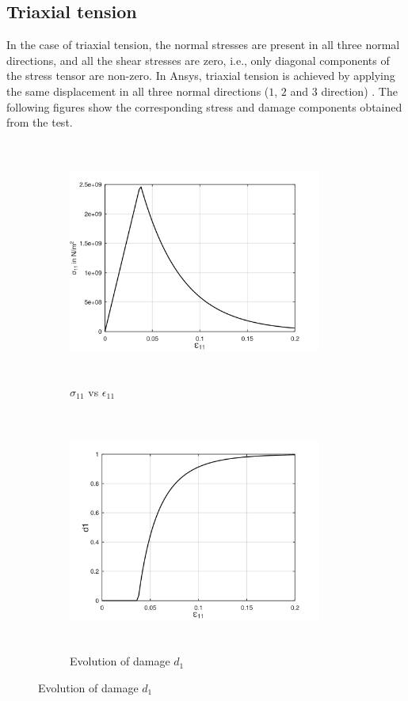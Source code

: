 \documentclass[12pt,openright,twoside]{report}
\begin{document}
\subsection{Triaxial tension}
\indent\indent\indent In the case of triaxial tension, the normal stresses are present in all three normal directions, and all the shear stresses are zero, i.e., only diagonal components of the stress tensor are non-zero.  In Ansys, triaxial tension is achieved by applying the same displacement in all three normal directions ($1$, $2$ and $3$ direction) \citep{ubt}. The following figures show the corresponding stress and damage components obtained from the test.\\

\begin{figure}[htbp!]
       \captionsetup[subfigure]{justification=centering}
     \begin{subfigure}{0.4\textwidth}
         \includegraphics[width=8.3cm,height=8cm,keepaspectratio]{24.S11vsE11.png}
         \caption{$\sigma_{11}$ vs $\epsilon_{11}$}
         \label{fig:S11vsE11 2}
     \end{subfigure}
     \hspace{1.8cm}
     \captionsetup[subfigure]{justification=centering}
     \begin{subfigure}{0.4\textwidth}
         \includegraphics[width=8.3cm,height=8cm,keepaspectratio]{24.d1.png}
         \caption{Evolution of damage $d_{1}$}
         \label{fig:Evolution of damage d1 2}
     \end{subfigure}
\end{figure}
\end{document}
